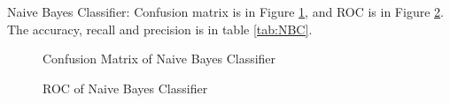 \documentclass{article}
\begin{document}
Naive Bayes Classifier: Confusion matrix is in Figure \ref{fig:CMNBC}, and ROC is in Figure \ref{fig:ROCNBC}. The accuracy, recall and precision is in table \ref{tab:NBC}.


\begin{figure}
\centering
{}
\caption{Confusion Matrix of Naive Bayes Classifier} \label{fig:CMNBC}
\end{figure}


\begin{figure}
\centering
{}
\caption{ROC of Naive Bayes Classifier} \label{fig:ROCNBC}
\end{figure}


\begin{table}[h]
\center
\caption{Estimation result for Naive Bayes Classifier}
\label{tab:NBC}
\end{table}
\end{document}
